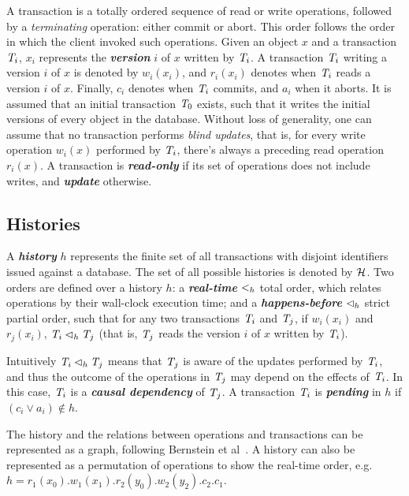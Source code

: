 A transaction is a totally ordered sequence of read or write operations, followed by a \emph{terminating} operation: either commit or abort. This order follows the order in which the client invoked such operations. Given an object $x$ and a transaction $\mathit{T}_i$, $x_i$ represents the \textbf{\em version} $i$ of $x$ written by $\mathit{T}_i$. A transaction $\mathit{T}_i$ writing a version $i$ of $x$ is denoted by $w_i(x_i)$, and $r_i(x_i)$ denotes when $\mathit{T}_i$ reads a version $i$ of $x$. Finally, $c_i$ denotes when $\mathit{T}_i$ commits, and $a_i$ when it aborts. It is assumed that an initial transaction $\mathit{T}_0$ exists, such that it writes the initial versions of every object in the database. Without loss of generality, one can assume that no transaction performs \emph{blind updates}, that is, for every write operation $w_i(x)$ performed by $\mathit{T}_i$, there's always a preceding read operation $r_i(x)$. A transaction is \textbf{\em read-only} if its set of operations does not include writes, and \textbf{\em update} otherwise.

\subsection{Histories}
\label{sect:histories}

A \textbf{\em history} $h$ represents the finite set of all transactions with disjoint identifiers issued against a database. The set of all possible histories is denoted by $\mathcal{H}$. Two orders are defined over a history $h$: a \textbf{\em real-time} $<_h$ total order, which relates operations by their wall-clock execution time; and a \textbf{\em happens-before} $\lhd_h$ strict partial order, such that for any two transactions $\mathit{T}_i$ and $\mathit{T}_j$, if $w_i(x_i)$ and $r_j(x_i)$, $\mathit{T}_i \lhd_h \mathit{T}_j$ (that is, $\mathit{T}_j$ reads the version $i$ of $x$ written by $\mathit{T}_i$).

Intuitively $\mathit{T}_i \lhd_h \mathit{T}_j$ means that $\mathit{T}_j$ is aware of the updates performed by $\mathit{T}_i$, and thus the outcome of the operations in $\mathit{T}_j$ may depend on the effects of $\mathit{T}_i$. In this case, $\mathit{T}_i$ is a \textbf{\em causal dependency} of $\mathit{T}_j$. A transaction $\mathit{T}_i$ is \textbf{\em pending} in $h$ if $(c_i \vee a_i) \notin h$.

The history and the relations between operations and transactions can be represented as a graph, following Bernstein et al~\citep{bernstein_concurrency}. A history can also be represented as a permutation of operations to show the real-time order, e.g. $h=r_1(x_0).w_1(x_1).r_2(y_0).w_2(y_2).c_2.c_1$.

